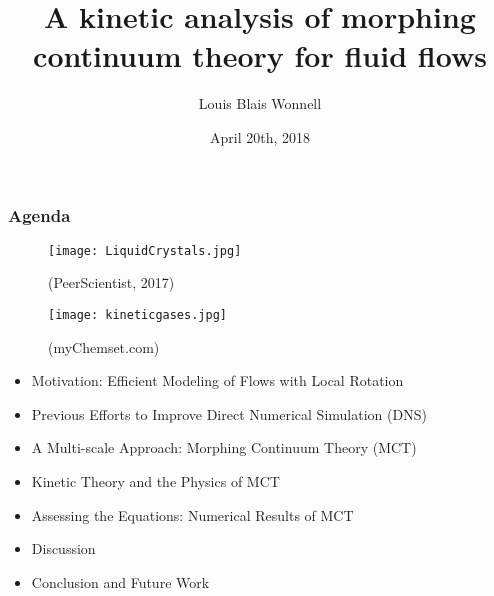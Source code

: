 \documentclass{beamer}
\title[Kinetic Analysis of MCT]{A kinetic analysis of morphing continuum theory 
for fluid flows} %
\author[Wonnell]{\Large Louis Blais Wonnell} %
\institute[K-State] %
{\large Major Professor: Dr. James Chen \\ 
\medskip
\normalsize Department of Mechanical and Nuclear 
Engineering, \\ Kansas State University \\ %
\medskip
}
\date[PhD Defense]
{\large April 20th, 
2018} %
\begin{document}
\begin{frame}
\titlepage %
\end{frame}

\begin{frame}
\frametitle{Agenda}
\begin{multicols}{2}
\begin{figure}
 \texttt{[image: LiquidCrystals.jpg]}
 \caption{\tiny (PeerScientist, 2017)}
\end{figure}
 \begin{figure}
\texttt{[image: kineticgases.jpg]}
\caption{\tiny (myChemset.com)}
\end{figure}
\end{multicols}
\begin{multicols}{2}
  \centering
  \begin{itemize}
  \small
  \item Motivation: Efficient Modeling of Flows with Local Rotation 
   \item Previous Efforts to Improve Direct Numerical Simulation (DNS)
   \item A Multi-scale Approach: Morphing Continuum Theory (MCT)
   \item Kinetic Theory and the Physics of MCT
   \item Assessing the Equations: Numerical Results of MCT
   \item Discussion
   \item Conclusion and Future Work
  \end{itemize}
\end{multicols}
\end{frame}
\end{document}
